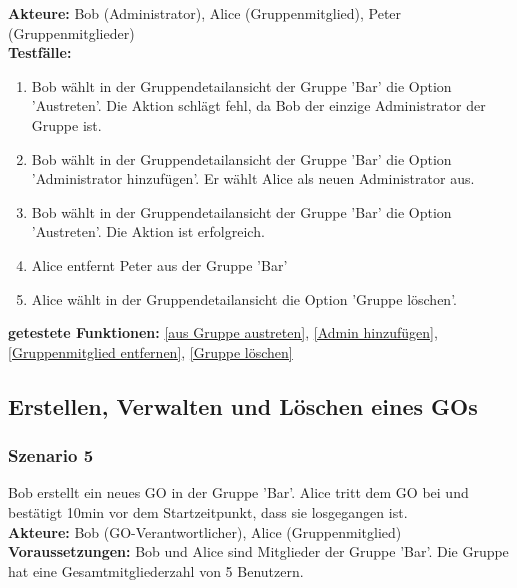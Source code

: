 \documentclass[parskip=full]{scrartcl}
\def\threedigits#1{%
  \ifnum#1<100 0\fi
  \ifnum#1<10 0\fi
  \number#1}
\begin{document}
\textbf{Akteure:} Bob (Administrator), Alice (Gruppenmitglied), Peter (Gruppenmitglieder) \\

\textbf{Testfälle:}
\begin{enumerate}[label={\textbf{/T\protect\threedigits{\theenumi}0/}}, leftmargin=*, resume]
	\item Bob wählt in der Gruppendetailansicht der Gruppe 'Bar' die Option 'Austreten'. Die Aktion schlägt fehl, da Bob der einzige Administrator der Gruppe ist.
	\item Bob wählt in der Gruppendetailansicht der Gruppe 'Bar' die Option 'Administrator hinzufügen'. Er wählt Alice als neuen Administrator aus.
	\item Bob wählt in der Gruppendetailansicht der Gruppe 'Bar' die Option 'Austreten'. Die Aktion ist erfolgreich.
	\item Alice entfernt Peter aus der Gruppe 'Bar'
	\item Alice wählt in der Gruppendetailansicht die Option 'Gruppe löschen'.
\end{enumerate}

\textbf{getestete Funktionen: }\ref{aus Gruppe austreten}, \ref{Admin hinzufügen}, \ref{Gruppenmitglied entfernen}, \ref{Gruppe löschen}

\subsection{Erstellen, Verwalten und Löschen eines GOs}

\subsubsection*{Szenario 5}Bob erstellt ein neues GO in der Gruppe 'Bar'. Alice tritt dem GO bei und bestätigt 10min vor dem Startzeitpunkt, dass sie losgegangen ist.\\

\textbf{Akteure:} Bob (GO-Verantwortlicher), Alice (Gruppenmitglied)\\

\textbf{Voraussetzungen: }Bob und Alice sind Mitglieder der Gruppe 'Bar'. Die Gruppe hat eine Gesamtmitgliederzahl von 5 Benutzern.\\
\end{document}
